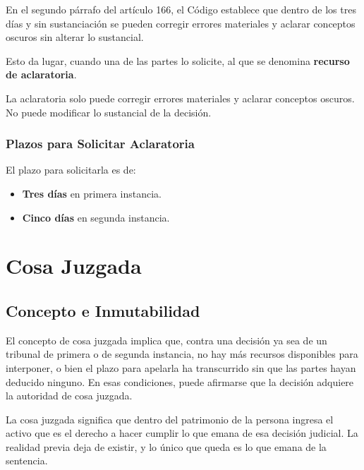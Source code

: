 \documentclass[12pt,oneside]{book}
\begin{document}
En el segundo párrafo del artículo 166, el Código establece que dentro de los tres días y sin sustanciación se pueden corregir errores materiales y aclarar conceptos oscuros sin alterar lo sustancial.

Esto da lugar, cuando una de las partes lo solicite, al que se denomina \textbf{recurso de aclaratoria}.

\begin{note}
La aclaratoria solo puede corregir errores materiales y aclarar conceptos oscuros. No puede modificar lo sustancial de la decisión.
\end{note}

\subsection{Plazos para Solicitar Aclaratoria}

El plazo para solicitarla es de:

\begin{itemize}
    \item \textbf{Tres días} en primera instancia.
    \item \textbf{Cinco días} en segunda instancia.
\end{itemize}


\chapter{Cosa Juzgada}

\section{Concepto e Inmutabilidad}

El concepto de cosa juzgada implica que, contra una decisión ya sea de un tribunal de primera o de segunda instancia, no hay más recursos disponibles para interponer, o bien el plazo para apelarla ha transcurrido sin que las partes hayan deducido ninguno. En esas condiciones, puede afirmarse que la decisión adquiere la autoridad de cosa juzgada.

\begin{important}
La cosa juzgada significa que dentro del patrimonio de la persona ingresa el activo que es el derecho a hacer cumplir lo que emana de esa decisión judicial. La realidad previa deja de existir, y lo único que queda es lo que emana de la sentencia.
\end{important}
\end{document}
